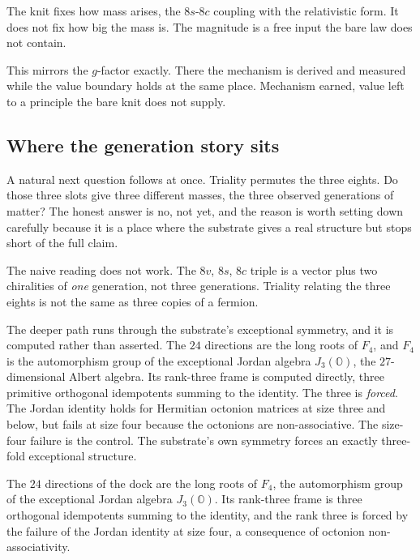 \begin{principle}
The knit fixes how mass arises, the $8s$-$8c$ coupling with the relativistic form. It does not fix how big the mass is. The magnitude is a free input the bare law does not contain.
\end{principle}

This mirrors the $g$-factor exactly. There the mechanism is derived and measured while the value boundary holds at the same place. Mechanism earned, value left to a principle the bare knit does not supply.

\subsection{Where the generation story sits}

A natural next question follows at once. Triality permutes the three eights. Do those three slots give three different masses, the three observed generations of matter? The honest answer is no, not yet, and the reason is worth setting down carefully because it is a place where the substrate gives a real structure but stops short of the full claim.

The naive reading does not work. The $8v$, $8s$, $8c$ triple is a vector plus two chiralities of \emph{one} generation, not three generations. Triality relating the three eights is not the same as three copies of a fermion.

The deeper path runs through the substrate's exceptional symmetry, and it is computed rather than asserted. The $24$ directions are the long roots of $F_4$, and $F_4$ is the automorphism group of the exceptional Jordan algebra $J_3(\mathbb{O})$, the $27$-dimensional Albert algebra. Its rank-three frame is computed directly, three primitive orthogonal idempotents summing to the identity. The three is \emph{forced}. The Jordan identity holds for Hermitian octonion matrices at size three and below, but fails at size four because the octonions are non-associative. The size-four failure is the control. The substrate's own symmetry forces an exactly three-fold exceptional structure.

\begin{proposition}
The $24$ directions of the dock are the long roots of $F_4$, the automorphism group of the exceptional Jordan algebra $J_3(\mathbb{O})$. Its rank-three frame is three orthogonal idempotents summing to the identity, and the rank three is forced by the failure of the Jordan identity at size four, a consequence of octonion non-associativity.
\end{proposition}

